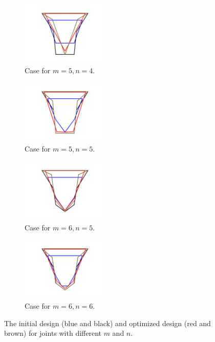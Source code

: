 \documentclass[letterpaper, 10 pt, conference]{ieeeconf}
\begin{document}
\begin{figure}
\begin{center}
\begin{subfigure}[t]{0.23\textwidth}
\begin{center}
\includegraphics[height=1.2in]{figures/best_4-5_joint.png}
\end{center}
\caption{Case for $m = 5, n = 4$. }
\label{fig:best_4-5_joint}
\end{subfigure}
\begin{subfigure}[t]{0.23\textwidth}
\begin{center}
\includegraphics[height=1.2in]{figures/best_5-5_joint.png}
\end{center}
\caption{Case for $m = 5, n = 5$. }
\label{fig:best_5-5_joint}
\end{subfigure}
\begin{subfigure}[t]{0.23\textwidth}
\begin{center}
\includegraphics[height=1.2in]{figures/best_5-6_joint.png}
\end{center}
\caption{Case for $m = 6, n = 5$. }
\label{fig:best_5-6_joint}
\end{subfigure}
\begin{subfigure}[t]{0.23\textwidth}
\begin{center}
\includegraphics[height=1.2in]{figures/best_6-6_joint.png}
\end{center}
\caption{Case for $m = 6, n = 6$.  }
\label{fig:best_6-6_joint}
\end{subfigure}
\caption{The initial design (blue and black) and optimized design  (red and brown) for joints with different $m$ and $n$. }
\label{fig:best_joint}
\end{center}
\end{figure}
\end{document}
